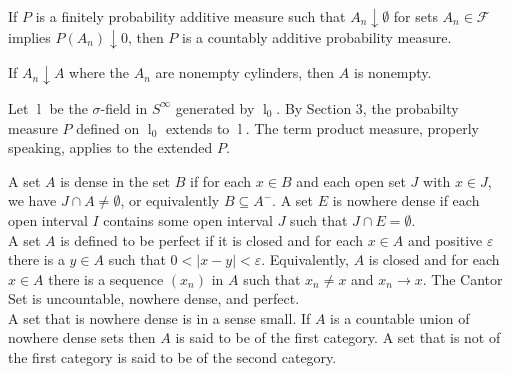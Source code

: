 \documentclass[11pt]{article}
\newcommand{\F}{\mathcal{F}}
\newcommand{\lc}{\mathop l}
\newcommand{\seq}{\subseteq}
\newcommand{\e}{\varepsilon}
\newcommand{\es}{\emptyset}
\newcommand{\ic}{\cap}
\newcommand{\abs}[1]{\left\lvert#1\right\rvert}
\newenvironment{definition}[2][Definition]{\begin{trivlist}
\item[\hskip \labelsep {\bfseries #1}\hskip \labelsep {\bfseries #2.}]}{\end{trivlist}}
\newenvironment{rmrk}[2][Remark]{\begin{trivlist}
\item[\hskip \labelsep {\bfseries #1}\hskip \labelsep {\bfseries #2.}]}{\end{trivlist}}
\newenvironment{lemma}[2][Lemma]{\begin{trivlist}
\item[\hskip \labelsep {\bfseries #1}\hskip \labelsep {\bfseries #2.}]}{\end{trivlist}}
\begin{document}
\begin{lemma}{18}
    If $P$ is a finitely probability additive measure such that $A_n \downarrow \es$ for sets $A_n \in \F$ implies $P(A_n) \downarrow 0$, then $P$ is a countably additive probability measure.
\end{lemma}

\begin{lemma}{19}
    If $A_n \downarrow A$ where the $A_n$ are nonempty cylinders, then $A$ is nonempty.
\end{lemma}

\begin{rmrk}{20}
    Let $\lc$ be the $\sigma$-field in $S^{\infty}$ generated by $\lc_0$. By Section 3, the probabilty measure $P$ defined on $\lc_0$ extends to $\lc$. The term product measure, properly speaking, applies to the extended $P$.
\end{rmrk}

\begin{definition}{A.15}
    A set $A$ is dense in the set $B$ if for each $x \in B$ and each open set $J$ with $x \in J$, we have $J \ic A \neq \es$, or equivalently $B \seq A^{-}$. A set $E$ is nowhere dense if each open interval $I$ contains some open interval $J$ such that $J \ic E = \es$. \\
    A set $A$ is defined to be perfect if it is closed and for each $x \in A$ and positive $\e$ there is a $y \in A$ such that $0 < \abs{x-y} < \e$. Equivalently, $A$ is closed and for each $x \in A$ there is a sequence $(x_n)$ in $A$ such that $x_n \neq x$ and $x_n \rightarrow x$. The Cantor Set is uncountable, nowhere dense, and perfect. \\
    A set that is nowhere dense is in a sense small. If $A$ is a countable union of nowhere dense sets then $A$ is said to be of the first category. A set that is not of the first category is said to be of the second category.
\end{definition}


\hrulefill
\end{document}

